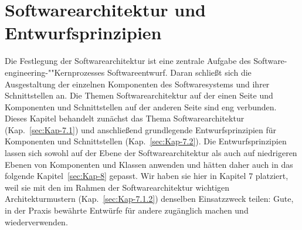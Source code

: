 \cleardoublepage
\chapter{Softwarearchitektur und Entwurfsprinzipien}
\label{sec:Kap-7}

Die Festlegung der Softwarearchitektur ist eine zentrale Aufgabe des Software-
\linebreak %
engineering-""Kernprozesses Softwareentwurf. Daran schließt sich die Ausgestaltung der einzelnen Komponenten des Softwaresystems und ihrer Schnittstellen an. Die Themen Software\-architektur auf der einen Seite und Komponenten und Schnittstellen auf der anderen Seite sind eng verbunden. Dieses Kapitel behandelt zunächst das Thema Softwarearchitektur (Kap.~\ref{sec:Kap-7.1}) und anschließend grundlegende Entwurfsprinzipien für Komponenten und Schnittstellen (Kap.~\ref{sec:Kap-7.2}). Die Entwurfsprinzipien lassen sich sowohl auf der Ebene der Softwarearchitektur als auch auf niedrigeren Ebenen von Komponenten und Klassen anwenden und hätten daher auch in das folgende Kapitel~\ref{sec:Kap-8} gepasst. Wir haben sie hier in Kapitel 7 platziert, weil sie mit den im Rahmen der Softwarearchitektur wichtigen Architekturmustern (Kap.~\ref{sec:Kap-7.1.2}) denselben Einsatzzweck teilen: Gute, in der Praxis bewährte Entwürfe für andere zugänglich machen und wiederverwenden.


\clearpage





\clearpage




\clearpage

